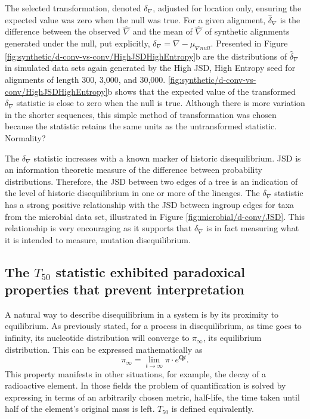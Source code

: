 The selected transformation, denoted $\delta_\nabla$, adjusted for location only, ensuring the expected value was zero when the null was true. For a given alignment, $\hat \delta_\nabla$ is the difference between the observed $\hat \nabla$ and the mean of  $\hat \nabla$ of synthetic alignments generated under the null, put explicitly, $\delta_\nabla =  \nabla - \mu_{\nabla{null}}.$ Presented in Figure \ref{fig:synthetic/d-conv-vs-conv/HighJSDHighEntropy}b are the distributions of $\hat \delta_\nabla$ in simulated data sets again generated by the High JSD, High Entropy seed for alignments of length 300, 3,000, and 30,000. \ref{fig:synthetic/d-conv-vs-conv/HighJSDHighEntropy}b shows that the expected value of the transformed $\delta_\nabla$ statistic is close to zero when the null is true. Although there is more variation in the shorter sequences, this simple method of transformation was chosen because the statistic retains the same units as the untransformed statistic. Normality?



The $\delta_\nabla$ statistic increases with a known marker of historic disequilibrium. JSD is an information theoretic measure of the difference between probability distributions. Therefore, the JSD between two edges of a tree is an indication of the level of historic disequilibrium in one or more of the lineages. The $\delta_\nabla$ statistic has a strong positive relationship with the JSD between ingroup edges for taxa from the microbial data set, illustrated in Figure \ref{fig:microbial/d-conv/JSD}. This relationship is very encouraging as it supports that $\delta_\nabla$ is in fact measuring what it is intended to measure, mutation disequilibrium. 



\subsection*{The $T_{50}$ statistic exhibited paradoxical properties that prevent interpretation}

A natural way to describe disequilibrium in a system is by its proximity to equilibrium. As previously stated, for a process in disequilibrium, as time goes to infinity, its nucleotide distribution will converge to $\pi_\infty$, its equilibrium distribution. This can be expressed mathematically as 
$$\pi_\infty = \lim_{t \to \infty}\pi \cdot e^{\mathbf{Q}t}.$$ 
This property manifests in other situations, for example, the decay of a radioactive element. In those fields the problem of quantification is solved by expressing in terms of an arbitrarily chosen metric, half-life, the time taken until half of the element's original mass is left. ${T_{50}}$ is defined equivalently.

